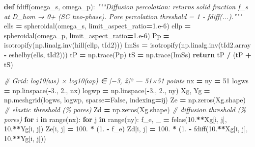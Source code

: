 \documentclass[
  a4paper,
  numbers=noendperiod,
  DIV=12]{scrreprt}
\newenvironment{Shaded}{\begin{snugshade}}{\end{snugshade}}
\newcommand{\BuiltInTok}[1]{#1}
\newcommand{\CommentTok}[1]{\textcolor[rgb]{0.56,0.35,0.01}{\textit{#1}}}
\newcommand{\ControlFlowTok}[1]{\textcolor[rgb]{0.13,0.29,0.53}{\textbf{#1}}}
\newcommand{\DecValTok}[1]{\textcolor[rgb]{0.00,0.00,0.81}{#1}}
\newcommand{\FloatTok}[1]{\textcolor[rgb]{0.00,0.00,0.81}{#1}}
\newcommand{\KeywordTok}[1]{\textcolor[rgb]{0.13,0.29,0.53}{\textbf{#1}}}
\newcommand{\NormalTok}[1]{#1}
\newcommand{\OperatorTok}[1]{\textcolor[rgb]{0.81,0.36,0.00}{\textbf{#1}}}
\newcommand{\StringTok}[1]{\textcolor[rgb]{0.31,0.60,0.02}{#1}}
\newcommand{\VariableTok}[1]{\textcolor[rgb]{0.00,0.00,0.00}{#1}}
\begin{document}
\begin{Shaded}
\begin{Highlighting}[]
\KeywordTok{def}\NormalTok{ fdiff(omega\_s, omega\_p):}
    \CommentTok{"""Diffusion percolation: returns solid fraction f\_s at D\_hom → 0+ (SC two{-}phase).}
\CommentTok{    Pore percolation threshold = 1 {-} fdiff(...)."""}
\NormalTok{    ells }\OperatorTok{=}\NormalTok{ spheroidal(omega\_s, limit\_aspect\_ratio}\OperatorTok{=}\FloatTok{1.e{-}6}\NormalTok{)}
\NormalTok{    ellp }\OperatorTok{=}\NormalTok{ spheroidal(omega\_p, limit\_aspect\_ratio}\OperatorTok{=}\FloatTok{1.e{-}6}\NormalTok{)}
\NormalTok{    Pp   }\OperatorTok{=}\NormalTok{ isotropify(np.linalg.inv(hill(ellp, tId2)))}
\NormalTok{    ImSs }\OperatorTok{=}\NormalTok{ isotropify(np.linalg.inv(tId2.array }\OperatorTok{{-}}\NormalTok{ eshelby(ells, tId2)))}
\NormalTok{    tP }\OperatorTok{=}\NormalTok{ np.trace(Pp)}
\NormalTok{    tS }\OperatorTok{=}\NormalTok{ np.trace(ImSs)}
    \ControlFlowTok{return}\NormalTok{ tP }\OperatorTok{/}\NormalTok{ (tP }\OperatorTok{+}\NormalTok{ tS)}
\end{Highlighting}
\end{Shaded}

\begin{Shaded}
\begin{Highlighting}[]
\CommentTok{\# Grid: log10(ωs) × log10(ωp) ∈ [−3, 2]² — 51×51 points}
\NormalTok{nx }\OperatorTok{=}\NormalTok{ ny }\OperatorTok{=} \DecValTok{51}
\NormalTok{logws }\OperatorTok{=}\NormalTok{ np.linspace(}\OperatorTok{{-}}\FloatTok{3.}\NormalTok{, }\FloatTok{2.}\NormalTok{, nx)}
\NormalTok{logwp }\OperatorTok{=}\NormalTok{ np.linspace(}\OperatorTok{{-}}\FloatTok{3.}\NormalTok{, }\FloatTok{2.}\NormalTok{, ny)}
\NormalTok{Xg, Yg }\OperatorTok{=}\NormalTok{ np.meshgrid(logws, logwp, sparse}\OperatorTok{=}\VariableTok{False}\NormalTok{, indexing}\OperatorTok{=}\StringTok{\textquotesingle{}ij\textquotesingle{}}\NormalTok{)}
\NormalTok{Ze }\OperatorTok{=}\NormalTok{ np.zeros(Xg.shape)    }\CommentTok{\# elastic threshold (\% pores)}
\NormalTok{Zd }\OperatorTok{=}\NormalTok{ np.zeros(Xg.shape)    }\CommentTok{\# diffusion threshold (\% pores)}
\ControlFlowTok{for}\NormalTok{ i }\KeywordTok{in} \BuiltInTok{range}\NormalTok{(nx):}
    \ControlFlowTok{for}\NormalTok{ j }\KeywordTok{in} \BuiltInTok{range}\NormalTok{(ny):}
\NormalTok{        f\_e, \_  }\OperatorTok{=}\NormalTok{ felas(}\FloatTok{10.}\OperatorTok{**}\NormalTok{Xg[i, j], }\FloatTok{10.}\OperatorTok{**}\NormalTok{Yg[i, j])}
\NormalTok{        Ze[i, j] }\OperatorTok{=} \FloatTok{100.} \OperatorTok{*}\NormalTok{ (}\FloatTok{1.} \OperatorTok{{-}}\NormalTok{ f\_e)}
\NormalTok{        Zd[i, j] }\OperatorTok{=} \FloatTok{100.} \OperatorTok{*}\NormalTok{ (}\FloatTok{1.} \OperatorTok{{-}}\NormalTok{ fdiff(}\FloatTok{10.}\OperatorTok{**}\NormalTok{Xg[i, j], }\FloatTok{10.}\OperatorTok{**}\NormalTok{Yg[i, j]))}
\end{Highlighting}
\end{Shaded}
\end{document}
